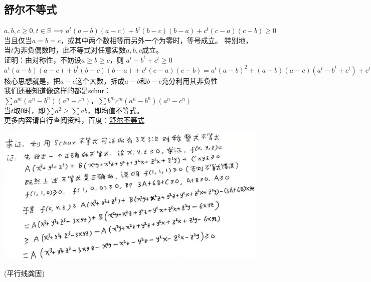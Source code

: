 \documentclass[UTF8]{ctexart}
\begin{document}
\subsection{舒尔不等式}
$ a,b,c \geq 0,t\in \mathbb{R}\implies a^{t}(a-b)(a-c)+b^{t}(b-c)(b-a)+c^{t}(c-a)(c-b)\geq 0$\\当且仅当$ a=b=c $，或其中两个数相等而另外一个为零时，等号成立。
特别地，当$ t $为非负偶数时，此不等式对任意实数$ a,b,c $成立。\\
证明：由对称性，不妨设$ a\geq b\geq c$，则 $a^{t}-b^{t}+c^{t}\geq 0 $\\
$ a^{t}(a-b)(a-c)+b^{t}(b-c)(b-a)+c^{t}(c-a)(c-b)=a^{t}(a-b)^{2}+(a-b)(a-c)(a^{t}-b^{t}+c^{t})+c^{t}(b-c)^{2}\geq 0 $\\
核心思想就是，把$ a-c $这个大数，拆成$ a-b $和$ b-c $充分利用其非负性\\
我们还要知道像这样的都是schur：\\
$\displaystyle  \sum  a^{m}\left(a^{n}-b^{n}\right)\left(a^{n}-c^{n}\right)$，$\displaystyle \sum b^{m} c^{m}\left(a^{n}-b^{n}\right)\left(a^{n}-c^{n}\right)$\\
当$ t $取$ 0 $时，即$ \displaystyle  \sum a^{2}\geq \displaystyle  \sum ab$，即均值不等式。\\
更多内容请自行查阅资料，百度：\href{https://baike.baidu.com/item/%E8%88%92%E5%B0%94%E4%B8%8D%E7%AD%89%E5%BC%8F/4224241?fr=aladdin}{舒尔不等式}
\begin{center}
	\includegraphics[width=0.8\linewidth]{0190}
\end{center}
(平行线\quad 龚固)
\end{document}
